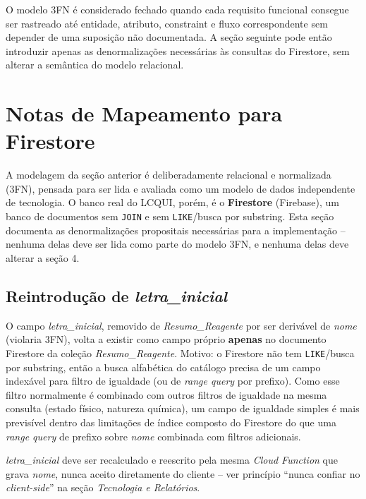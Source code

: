 \documentclass[12pt,a4paper]{article}
\begin{document}
\begin{explicacao}
O modelo 3FN é considerado fechado quando cada requisito funcional consegue ser rastreado até entidade, atributo, constraint e fluxo correspondente sem depender de uma suposição não documentada. A seção seguinte pode então introduzir apenas as denormalizações necessárias às consultas do Firestore, sem alterar a semântica do modelo relacional.
\end{explicacao}

\section{Notas de Mapeamento para Firestore}

\begin{explicacao}
A modelagem da seção anterior é deliberadamente relacional e normalizada (3FN), pensada para ser lida e avaliada como um modelo de dados independente de tecnologia. O banco real do LCQUI, porém, é o \textbf{Firestore} (Firebase), um banco de documentos sem \texttt{JOIN} e sem \texttt{LIKE}/busca por substring. Esta seção documenta as denormalizações propositais necessárias para a implementação -- nenhuma delas deve ser lida como parte do modelo 3FN, e nenhuma delas deve alterar a seção 4.
\end{explicacao}

\subsection{Reintrodução de \textit{letra\_inicial}}
O campo \textit{letra\_inicial}, removido de \textit{Resumo\_Reagente} por ser derivável de \textit{nome} (violaria 3FN), volta a existir como campo próprio \textbf{apenas} no documento Firestore da coleção \textit{Resumo\_Reagente}. Motivo: o Firestore não tem \texttt{LIKE}/busca por substring, então a busca alfabética do catálogo precisa de um campo indexável para filtro de igualdade (ou de \textit{range query} por prefixo). Como esse filtro normalmente é combinado com outros filtros de igualdade na mesma consulta (estado físico, natureza química), um campo de igualdade simples é mais previsível dentro das limitações de índice composto do Firestore do que uma \textit{range query} de prefixo sobre \textit{nome} combinada com filtros adicionais.

\begin{regra}
\textit{letra\_inicial} deve ser recalculado e reescrito pela mesma \textit{Cloud Function} que grava \textit{nome}, nunca aceito diretamente do cliente -- ver princípio ``nunca confiar no \textit{client-side}'' na seção \textit{Tecnologia e Relatórios}.
\end{regra}
\end{document}
